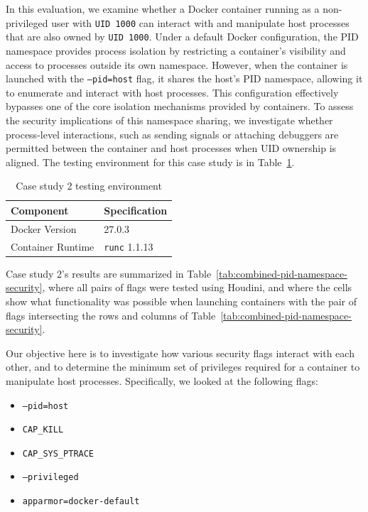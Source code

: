 \documentclass[12pt]{report}
\begin{document}
\begin{doublespace}
In this evaluation, we examine whether a Docker container running as a non-privileged user with \texttt{UID 1000} can interact with and manipulate host processes that are also owned by \texttt{UID 1000}. Under a default Docker configuration, the PID namespace provides process isolation by restricting a container's visibility and access to processes outside its own namespace. However, when the container is launched with the \texttt{--pid=host} flag, it shares the host’s PID namespace, allowing it to enumerate and interact with host processes. This configuration effectively bypasses one of the core isolation mechanisms provided by containers. To assess the security implications of this namespace sharing, we investigate whether process-level interactions, such as sending signals or attaching debuggers are permitted between the container and host processes when UID ownership is aligned. The testing environment for this case study is in Table~\ref{table:case2env}.

\begin{table}[h!]
\caption{Case study 2 testing environment\label{table:case2env}}
\centering
\scriptsize \begin{tabular}{|l|l|} 
\hline
\textbf{Component} & \textbf{Specification} \\
\hline
Docker Version & 27.0.3 \\
\hline
Container Runtime & \texttt{runc} 1.1.13 \\
\hline
\end{tabular}
\end{table}

Case study 2's results are summarized in Table~\ref{tab:combined-pid-namespace-security}, where all pairs of flags were tested using Houdini, and where the cells show what functionality was possible when launching containers with the pair of flags intersecting the rows and columns of Table~\ref{tab:combined-pid-namespace-security}. 

Our objective here is to investigate how various security flags interact with each other, and to determine the minimum set of privileges required for a container to manipulate host processes. Specifically, we looked at the following flags:

\begin{itemize}
    \item \texttt{--pid=host}
    \item \texttt{CAP\_KILL}
    \item \texttt{CAP\_SYS\_PTRACE}
    \item \texttt{--privileged}
    \item \texttt{apparmor=docker-default}
\end{itemize}


\end{doublespace}
\end{document}
